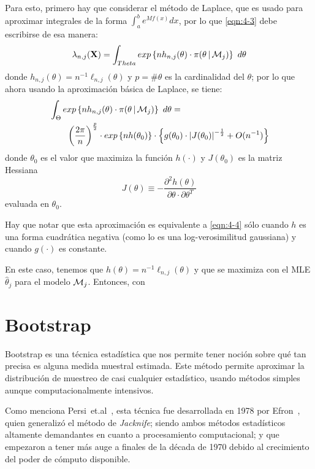 Para esto, primero hay que considerar el método de Laplace, que es usado para aproximar integrales de la forma $\int_a^b e^{M f(x)} dx$, por lo que \eqref{eqn:4-3} debe escribirse de esa manera: 
\begin{equation}
\lambda_{n, j}(\textbf{X}) = \int_{Theta} exp\left\lbrace n h_{n, j}(\theta) \cdot \pi(\theta \,|\, \mathcal{M}_j) \right\rbrace ~d\theta 
\label{eqn:4-6}
\end{equation}
donde $h_{n, j}(\theta) = n^{-1} \ell_{n, j}(\theta)$ y $p = \#\theta$ es la cardinalidad del $\theta$; por lo que ahora usando la aproximación básica de Laplace, se tiene: 
\begin{equation}
\begin{split}
 &\int_{\Theta} exp \left\lbrace n h_{n, j}(\theta) \cdot \pi(\theta \,|\, \mathcal{M}_j) \right\rbrace ~d\theta = \\
 & \quad\quad \left( \frac{2 \pi}{n} \right)^{\frac{p}{2}} \cdot exp \left\lbrace n h(\theta_0) \right\rbrace \cdot
 \left\lbrace g(\theta_0) \cdot \left| J(\theta_0) \right| ^{-\frac{1}{2}} + O(n^{-1}) \right\rbrace
\end{split}
\label{eqn:4-7}
\end{equation}
donde $\theta_0$ es el valor que maximiza la función $h(\cdot)$ y $J(\theta_0)$ es la matriz Hessiana 
\begin{equation}
J(\theta) \equiv -\frac{\partial^2 h(\theta)}{\partial \theta \cdot \partial \theta^T}
\label{eqn:4-8}
\end{equation}
evaluada en $\theta_0$.

Hay que notar que esta aproximación es equivalente a \eqref{eqn:4-4} sólo cuando $h$ es una forma cuadrática negativa (como lo es una log-verosimilitud gaussiana) y cuando $g(\cdot)$ es constante. 

En este caso, tenemos que $h(\theta) = n^{-1} \ell_{n, j}(\theta)$ y que se maximiza con el \ac{MLE} $\hat \theta_j$ para el modelo $\mathcal{M}_j$. Entonces, con 

\section{Bootstrap}

Bootstrap es una técnica estadística que nos permite tener noción sobre qué tan precisa es alguna medida muestral estimada. Este método permite aproximar la distribución de muestreo de casi cualquier estadístico, usando métodos simples aunque computacionalmente intensivos. 

Como menciona Persi~et.al~\cite{Diaconis1983}, esta técnica fue desarrollada en 1978 por Efron~\cite{Efron1978}, quien generalizó el método de \textit{Jacknife}; siendo ambos métodos estadísticos altamente demandantes en cuanto a procesamiento computacional; y que empezaron a tener más auge a finales de la década de 1970 debido al crecimiento del poder de cómputo disponible.

